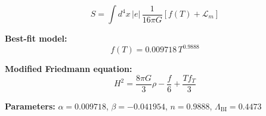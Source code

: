 
\begin{equation}
  S = \int d^4x \, |e| \, \frac{1}{16\pi G} \left[ f(T) + \mathcal{L}_m \right]
\end{equation}

\textbf{Best-fit model:}
\begin{equation}
  f(T) = 0.009718 \, T^{0.9888}
\end{equation}

\textbf{Modified Friedmann equation:}
\begin{equation}
  H^2 = \frac{8\pi G}{3} \rho - \frac{f}{6} + \frac{T f_T}{3}
\end{equation}

\textbf{Parameters:}
$\alpha = 0.009718$, \quad
$\beta = -0.041954$, \quad
$n = 0.9888$, \quad
$\Lambda_{\text{BI}} = 0.4473$